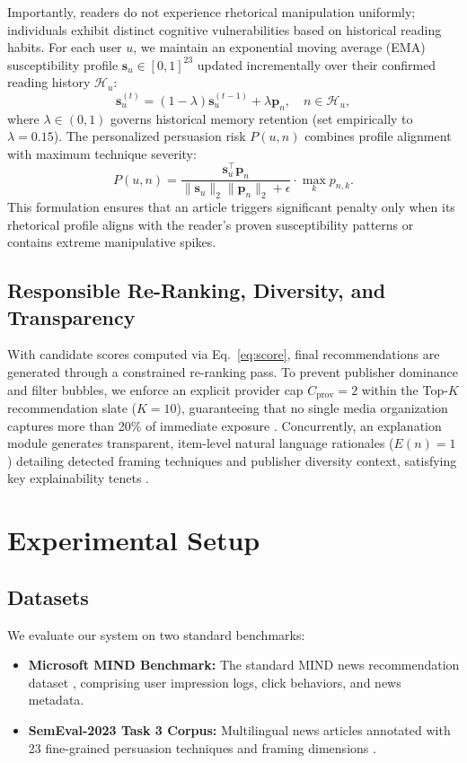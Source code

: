 \documentclass[conference]{IEEEtran}
\begin{document}
Importantly, readers do not experience rhetorical manipulation uniformly; individuals exhibit distinct cognitive vulnerabilities based on historical reading habits. For each user $u$, we maintain an exponential moving average (EMA) susceptibility profile $\mathbf{s}_u \in [0,1]^{23}$ updated incrementally over their confirmed reading history $\mathcal{H}_u$:
\begin{equation}
\mathbf{s}_u^{(t)} = (1 - \lambda) \mathbf{s}_u^{(t-1)} + \lambda \mathbf{p}_n, \quad n \in \mathcal{H}_u,
\end{equation}
where $\lambda \in (0,1)$ governs historical memory retention (set empirically to $\lambda=0.15$). The personalized persuasion risk $P(u,n)$ combines profile alignment with maximum technique severity:
\begin{equation}
P(u,n) = \frac{\mathbf{s}_u^\top \mathbf{p}_n}{\|\mathbf{s}_u\|_2 \|\mathbf{p}_n\|_2 + \epsilon} \cdot \max_{k} p_{n,k}.
\end{equation}
This formulation ensures that an article triggers significant penalty only when its rhetorical profile aligns with the reader's proven susceptibility patterns or contains extreme manipulative spikes.

\subsection{Responsible Re-Ranking, Diversity, and Transparency}
With candidate scores computed via Eq.~\ref{eq:score}, final recommendations are generated through a constrained re-ranking pass. To prevent publisher dominance and filter bubbles, we enforce an explicit provider cap $C_{\text{prov}} = 2$ within the Top-$K$ recommendation slate ($K=10$), guaranteeing that no single media organization captures more than 20\% of immediate exposure \cite{li_profai}. Concurrently, an explanation module generates transparent, item-level natural language rationales ($E(n)=1$) detailing detected framing techniques and publisher diversity context, satisfying key explainability tenets \cite{ribeiro_lime}.

\section{Experimental Setup}
\subsection{Datasets}
We evaluate our system on two standard benchmarks:
\begin{itemize}
    \item \textbf{Microsoft MIND Benchmark:} The standard MIND news recommendation dataset \cite{wu_mind}, comprising user impression logs, click behaviors, and news metadata.
    \item \textbf{SemEval-2023 Task 3 Corpus:} Multilingual news articles annotated with 23 fine-grained persuasion techniques and framing dimensions \cite{piskorski_semeval}.
\end{itemize}
\end{document}
